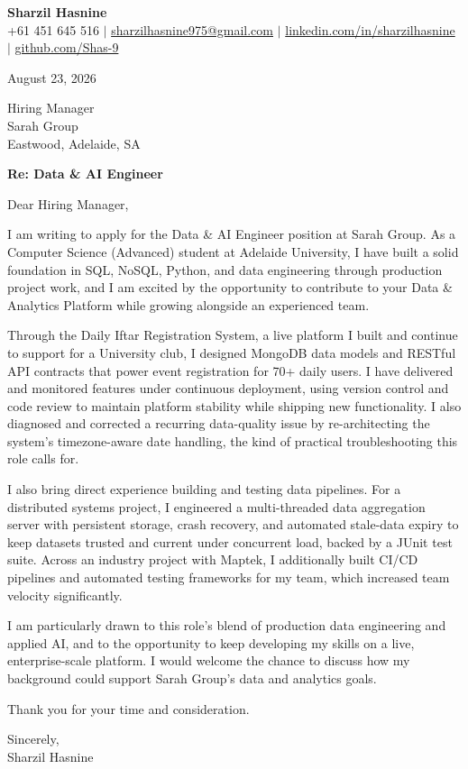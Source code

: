 \documentclass[letterpaper,11pt]{article}
\begin{document}
\begin{center}
    \textbf{\Large Sharzil Hasnine} \\ \vspace{3pt}
    \small +61 451 645 516 $|$ \href{mailto:sharzilhasnine975@gmail.com}{sharzilhasnine975@gmail.com} $|$
    \href{https://www.linkedin.com/in/sharzilhasnine/}{linkedin.com/in/sharzilhasnine} $|$
    \href{https://github.com/Shas-9}{github.com/Shas-9}
\end{center}

\vspace{10pt}

August 23, 2026

Hiring Manager \\
Sarah Group \\
Eastwood, Adelaide, SA

\vspace{5pt}

\textbf{Re: Data \& AI Engineer}

Dear Hiring Manager,

I am writing to apply for the Data \& AI Engineer position at Sarah Group. As a Computer Science (Advanced) 
student at Adelaide University, I have built a solid foundation in SQL, NoSQL, Python, and data engineering through
 production project work, and I am excited by the opportunity to contribute to your Data \& Analytics Platform
 while growing alongside an experienced team.

Through the Daily Iftar Registration System, a live platform I built and continue to support for a University
club, I designed MongoDB data models and RESTful API contracts that power event registration for 70+ 
daily users. I have delivered and monitored features under continuous deployment, using version control and 
code review to maintain platform stability while shipping new functionality. I also diagnosed and corrected 
a recurring data-quality issue by re-architecting the system's timezone-aware date handling, the kind of 
practical troubleshooting this role calls for.

I also bring direct experience building and testing data pipelines. For a distributed systems project, I 
engineered a multi-threaded data aggregation server with persistent storage, crash recovery, and automated 
stale-data expiry to keep datasets trusted and current under concurrent load, backed by a JUnit test suite.  
Across an industry project with Maptek, I additionally built CI/CD pipelines and automated testing frameworks 
for my team, which increased team velocity significantly.

I am particularly drawn to this role's blend of production data engineering and applied AI, and to the 
opportunity to keep developing my skills on a live, enterprise-scale platform. I would welcome the chance 
to discuss how my background could support Sarah Group's data and analytics goals.

Thank you for your time and consideration.

\vspace{10pt}

Sincerely, \\
Sharzil Hasnine
\end{document}
